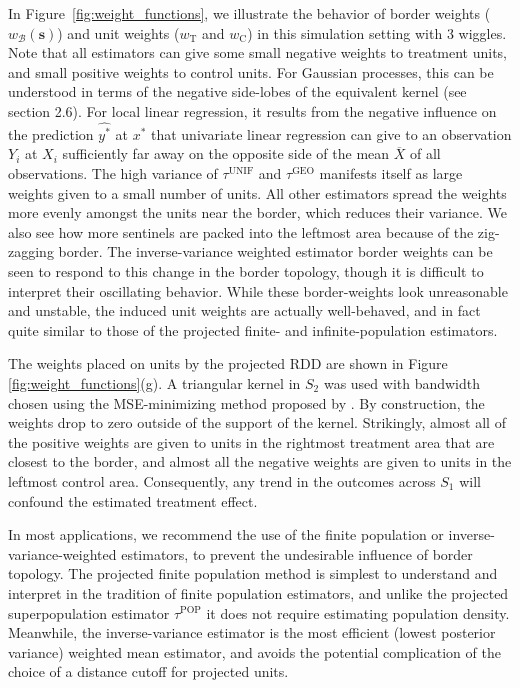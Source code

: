 \documentclass[letter]{article}
\newcommand{\treat}{\mathrm{T}}
\newcommand{\ctrol}{\mathrm{C}}
\newcommand{\svec}{\mathbold{s}}
\newcommand{\border}{\mathcal{B}}
\newcommand{\unifavg}{\tau^{\mathrm{UNIF}}}
\newcommand{\taugeo}{\tau^{\mathrm{GEO}}}
\newcommand{\taupop}{\tau^{\mathrm{POP}}}
\newcommand{\weightb}{w_{\border}}
\newcommand{\wt}{w_{\treat}}
\newcommand{\wc}{w_{\ctrol}}
\renewcommand{\cite}[1]{\citep{#1}}
\begin{document}
    	In Figure~\ref{fig:weight_functions}, we illustrate the behavior of border weights (\(\weightb(\svec)\)) and unit weights (\(\wt\) and \(\wc\)) in this simulation setting with 3 wiggles.
Note that all estimators can give some small negative weights to treatment units, and small positive weights to control units.
For Gaussian processes, this can be understood in terms of the negative side-lobes of the equivalent kernel (see \cite{rasmussen2006gaussian} section 2.6).
For local linear regression, it results from the negative influence on the prediction \(\widehat{y^*}\) at \(x^*\) that univariate linear regression can give to an observation \(Y_i\) at \(X_i\) sufficiently far away on the opposite side of the mean \(\overline{X}\) of all observations.
The high variance of \(\unifavg\) and \(\taugeo\) manifests itself as large weights given to a small number of units.
All other estimators spread the weights more evenly amongst the units near the border, which reduces their variance.
We also see how more sentinels are packed into the leftmost area because of the zig-zagging border.
The inverse-variance weighted estimator border weights can be seen to respond to this change in the border topology, though it is difficult to interpret their oscillating behavior.
While these border-weights look unreasonable and unstable, the induced unit weights are actually well-behaved, and in fact quite similar to those of the projected finite- and infinite-population estimators.

The weights placed on units by the projected RDD are shown in Figure \ref{fig:weight_functions}(g).
A triangular kernel in \(S_2\) was used with bandwidth chosen using the MSE-minimizing method proposed by \cite{imbens2012optimal}.
By construction, the weights drop to zero outside of the support of the kernel.
Strikingly, almost all of the positive weights are given to units in the rightmost treatment area that are closest to the border, and almost all the negative weights are given to units in the leftmost control area.
Consequently, any trend in the outcomes across \(S_1\) will confound the estimated treatment effect.

In most applications, we recommend the use of the finite population or inverse-variance-weighted estimators, to prevent the undesirable influence of border topology.
The projected finite population method is simplest to understand and interpret in the tradition of finite population estimators, and unlike the projected superpopulation estimator \(\taupop\) it does not require estimating population density.
Meanwhile, the inverse-variance estimator is the most efficient (lowest posterior variance) weighted mean estimator,
and avoids the potential complication of the choice of a distance cutoff for projected units.
    
\end{document}
